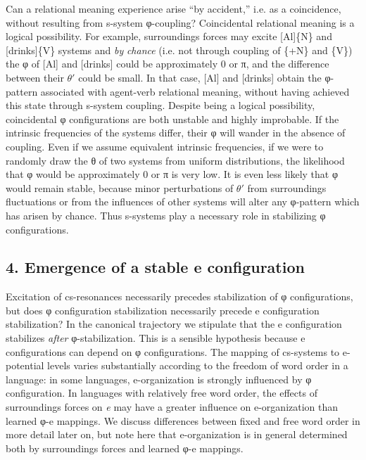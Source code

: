   Can a relational meaning experience arise “by accident,” i.e. as a coincidence, without resulting from s-system φ-coupling? Coincidental relational meaning is a logical possibility. For example, surroundings forces may excite [Al]\{N\} and [drinks]\{V\} systems and \textit{by} \textit{chance} (i.e. not through coupling of \{+N\} and \{V\}) the φ of [Al] and [drinks] could be approximately 0 or π, and the difference between their $\theta ′$ could be small. In that case, [Al] and [drinks] obtain the φ-pattern associated with agent-verb relational meaning, without having achieved this state through s-system coupling. Despite being a logical possibility, coincidental φ configurations are both unstable and highly improbable. If the intrinsic frequencies of the systems differ, their φ will wander in the absence of coupling. Even if we assume equivalent intrinsic frequencies, if we were to randomly draw the θ of two systems from uniform distributions, the likelihood that φ would be approximately 0 or π is very low. It is even less likely that φ would remain stable, because minor perturbations of $\theta ′$ from surroundings fluctuations or from the influences of other systems will alter any φ-pattern which has arisen by chance. Thus s-systems play a necessary role in stabilizing φ configurations.

\subsection{4. Emergence of a stable e configuration}

Excitation of cs-resonances necessarily precedes stabilization of φ configurations, but does φ configuration stabilization necessarily precede e configuration stabilization? In the canonical trajectory we stipulate that the e configuration stabilizes \textit{after} φ-stabilization. This is a sensible hypothesis because e configurations can depend on φ configurations. The mapping of cs-systems to e-potential levels varies substantially according to the freedom of word order in a language: in some languages, e-organization is strongly influenced by φ configuration. In languages with relatively free word order, the effects of surroundings forces on \textit{e} may have a greater influence on e-organization than learned φ-e mappings. We discuss differences between fixed and  free word order in more detail later on, but note here that e-organization is in general determined both by surroundings forces and learned φ-e mappings.

